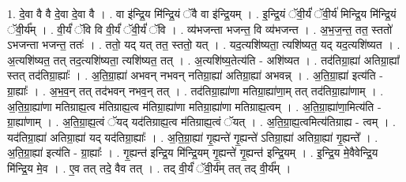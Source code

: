 \documentclass[17pt]{extarticle}
\begin{document}
1. दे॒वा वै वै दे॒वा दे॒वा वै । . वा इ॑न्द्रि॒य मि॑न्द्रि॒यं ॅवै वा इ॑न्द्रि॒यम् । . इ॒न्द्रि॒यं ॅवी॒र्यं॑ ॅवी॒र्य॑ मिन्द्रि॒य मि॑न्द्रि॒यं ॅवी॒र्य᳚म् । . वी॒र्यं॑ ॅवि वि वी॒र्यं॑ ॅवी॒र्यं॑ ॅवि । . व्य॑भजन्ता भजन्त॒ वि व्य॑भजन्त । . अ॒भ॒ज॒न्त॒ तत॒ स्ततो॑ ऽभजन्ता भजन्त॒ ततः॑ । . ततो॒ यद् यत् तत॒ स्ततो॒ यत् । . यद॒त्यशि॑ष्यता॒ त्यशि॑ष्यत॒ यद् यद॒त्यशि॑ष्यत । . अ॒त्यशि॑ष्यत॒ तत् तद॒त्यशि॑ष्यता॒ त्यशि॑ष्यत॒ तत् । . अ॒त्यशि॑ष्य॒तेत्य॑ति - अशि॑ष्यत । . तद॑तिग्रा॒ह्या॑ अतिग्रा॒ह्या᳚ स्तत् तद॑तिग्रा॒ह्याः᳚ । . अ॒ति॒ग्रा॒ह्या॑ अभवन् नभवन् नतिग्रा॒ह्या॑ अतिग्रा॒ह्या॑ अभवन्न् । . अ॒ति॒ग्रा॒ह्या॑ इत्य॑ति - ग्रा॒ह्याः᳚ । . अ॒भ॒व॒न् तत् तद॑भवन् नभव॒न् तत् । . तद॑तिग्रा॒ह्या॑णा मतिग्रा॒ह्या॑णा॒म् तत् तद॑तिग्रा॒ह्या॑णाम् । . अ॒ति॒ग्रा॒ह्या॑णा मतिग्राह्य॒त्व म॑तिग्राह्य॒त्व म॑तिग्रा॒ह्या॑णा मतिग्रा॒ह्या॑णा मतिग्राह्य॒त्वम् । . अ॒ति॒ग्रा॒ह्या॑णा॒मित्य॑ति - ग्रा॒ह्या॑णाम् । . अ॒ति॒ग्रा॒ह्य॒त्वं ॅयद् यद॑तिग्राह्य॒त्व म॑तिग्राह्य॒त्वं ॅयत् । . अ॒ति॒ग्रा॒ह्य॒त्वमित्य॑तिग्राह्य - त्वम् । . यद॑तिग्रा॒ह्या॑ अतिग्रा॒ह्या॑ यद् यद॑तिग्रा॒ह्याः᳚ । . अ॒ति॒ग्रा॒ह्या॑ गृ॒ह्यन्ते॑ गृ॒ह्यन्ते॑ ऽतिग्रा॒ह्या॑ अतिग्रा॒ह्या॑ गृ॒ह्यन्ते᳚ । . अ॒ति॒ग्रा॒ह्या॑ इत्य॑ति - ग्रा॒ह्याः᳚ । . गृ॒ह्यन्त॑ इन्द्रि॒य मि॑न्द्रि॒यम् गृ॒ह्यन्ते॑ गृ॒ह्यन्त॑ इन्द्रि॒यम् । . इ॒न्द्रि॒य मे॒वैवेन्द्रि॒य मि॑न्द्रि॒य मे॒व । . ए॒व तत् तदे॒ वैव तत् । . तद् वी॒र्यं॑ ॅवी॒र्य॑म् तत् तद् वी॒र्य᳚म् । \newline
\end{document}
